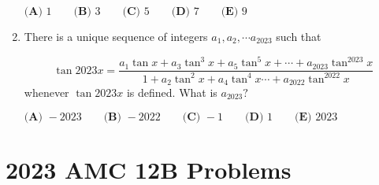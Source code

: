 \documentclass{article}
\begin{document}
\begin{enumerate}[label=\arabic*., itemsep=0.5em]
\(\textbf{(A) } 1 \qquad \textbf{(B) } 3 \qquad \textbf{(C) } 5 \qquad \textbf{(D) } 7 \qquad \textbf{(E) } 9\)\par \vspace{0.5em}\item There is a unique sequence of integers \(a_1, a_2, \cdots a_{2023}\) such that

\begin{equation*}
\tan2023x = \frac{a_1 \tan x + a_3 \tan^3 x + a_5 \tan^5 x + \cdots + a_{2023} \tan^{2023} x}{1 + a_2 \tan^2 x + a_4 \tan^4 x \cdots + a_{2022} \tan^{2022} x}
\end{equation*}
whenever \(\tan 2023x\) is defined. What is \(a_{2023}?\)

\(\textbf{(A) } -2023 \qquad\textbf{(B) } -2022 \qquad\textbf{(C) } -1 \qquad\textbf{(D) } 1 \qquad\textbf{(E) } 2023\)\par \vspace{0.5em}
\end{enumerate}
\newpage\section*{2023 AMC 12B Problems}
\end{document}
